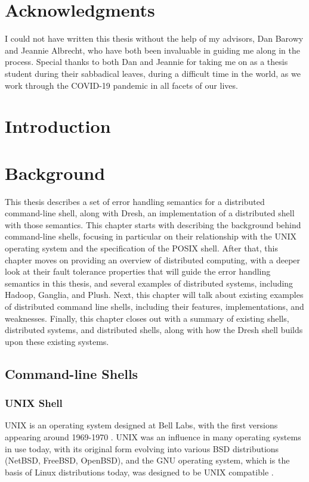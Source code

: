 \documentclass[twoside]{report}
\begin{document}
\chapter*{Acknowledgments}

I could not have written this thesis without the help of my advisors, Dan Barowy and Jeannie Albrecht, who have both been invaluable in guiding me along in the process. Special thanks to both Dan and Jeannie for taking me on as a thesis student during their sabbadical leaves, during a difficult time in the world, as we work through the COVID-19 pandemic in all facets of our lives.



\chapter{Introduction}


\chapter{Background}

This thesis describes a set of error handling semantics for a distributed command-line shell, along with Dresh, an implementation of a distributed shell with those semantics.
This chapter starts with describing the background behind command-line shells, focusing in particular on their relationship with the UNIX operating system and the specification of the POSIX shell.
After that, this chapter moves on providing an overview of distributed computing, with a deeper look at their fault tolerance properties that will guide the error handling semantics in this thesis, and several examples of distributed systems, including Hadoop, Ganglia, and Plush.
Next, this chapter will talk about existing examples of distributed command line shells, including their features, implementations, and weaknesses.
Finally, this chapter closes out with a summary of existing shells, distributed systems, and distributed shells, along with how the Dresh shell builds upon these existing systems.

\section{Command-line Shells}
\subsection{UNIX Shell}
UNIX is an operating system designed at Bell Labs, with the first versions appearing around 1969-1970 \cite{10.1145/361011.361061}.
UNIX was an influence in many operating systems in use today, with its original form evolving into various BSD distributions (NetBSD, FreeBSD, OpenBSD), and the GNU operating system, which is the basis of Linux distributions today, was designed to be UNIX compatible \cite{bretthauer2001open}.
\end{document}
